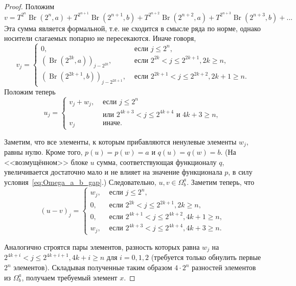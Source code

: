 \documentclass[a4paper,14pt]{article} %
\theoremstyle{plain}
\begin{document}
\begin{proof}
	Положим
	\begin{equation}
		v = T^{2^n} \operatorname{Br}(2^ n   ,a) + T^{2^{n+1}} \operatorname{Br}(2^{n+1},b) +
		T^{2^{n+2}} \operatorname{Br}(2^{n+2},a) + T^{2^{n+3}} \operatorname{Br}(2^{n+3},b) + ...
	\end{equation}
	Эта сумма является формальной, т.е. не сходится в смысле ряда по норме,
	однако носители слагаемых попарно не пересекаются.
	Иначе говоря,
	\begin{equation}
		v_j = \begin{cases}
			0,  & \mbox{~если~} j \leq 2^n,
			\\
			(\operatorname{Br}(2^{2k  },a))_{j-2^{2k  }},  & \mbox{~если~} 2^{2k  } < j \leq 2^{2k+1}, 2k   \geq n,
			\\
			(\operatorname{Br}(2^{2k+1},b))_{j-2^{2k+1}},  & \mbox{~если~} 2^{2k+1} < j \leq 2^{2k+2}, 2k+1 \geq n
			.
		\end{cases}
	\end{equation}
	Положим теперь
	\begin{equation}
		u_j = \begin{cases}
			v_j + w_j,  & \mbox{~если~} j \leq 2^n
			\\
			            & \mbox{~или~} 2^{4k+3} < j \leq 2^{4k+4} \mbox{~и~} 4k + 3 \geq n,
			\\
			v_j         & \mbox{~иначе.~}
		\end{cases}
	\end{equation}

	Заметим, что все элементы, к которым прибавляются ненулевые элементы $w_j$, равны нулю.
	Кроме того, $p(u)=p(w)=a$ и $q(u)=q(w)=b$.
	(На <<возмущённом>> блоке $u$ сумма, соответствующая функционалу $q$,
	увеличивается достаточно мало и не влияет на значение функционала $p$,
	в силу условия~\eqref{eq:Omega_a_b_gap}.)
	Следовательно, $u,v\in\Omega^a_b$.
	Заметим теперь, что
	\begin{equation}
		(u-v)_j = \begin{cases}
			w_j,  & \mbox{~если~} j \leq 2^n,
			\\
			0,  & \mbox{~если~} 2^{2k  } < j \leq 2^{2k+1}, 2k    \geq n,
			\\
			0,  & \mbox{~если~} 2^{4k+1} < j \leq 2^{4k+2}, 4k + 1 \geq n,
			\\
			w_j,  & \mbox{~если~} 2^{4k+3} < j \leq 2^{4k+4}, 4k + 3 \geq n
			.
		\end{cases}
	\end{equation}

	Аналогично строятся пары элементов, разность которых равна $w_j$ на $2^{4k+i} < j \leq 2^{4k+i+1}, 4k + i \geq n$ для $i=0,1,2$
	(требуется только обнулить первые $2^n$ элементов).
	Складывая полученные таким образом $4\cdot 2^n$ разностей элементов из $\Omega^a_b$, получаем требуемый элемент $x$.

\end{proof}
\end{document}
